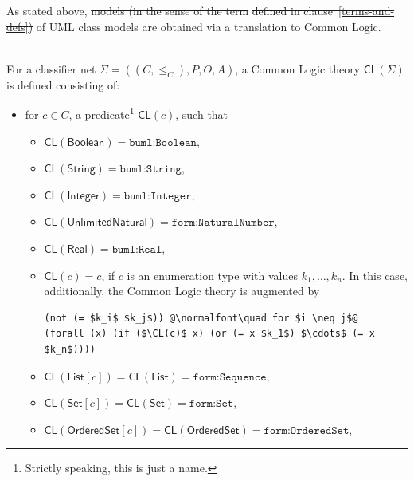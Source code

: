 \documentclass[10pt, a4paper]{isov2}
\newcommand{\ec}[0]{~\\{{\color{violet}\large \hrulefill {\normalfont{end}} \hrulefill\\}  }}
\newcommand*{\termref}[1]{\index{#1}#1\xspace}
\newcommand*{\CL}{\ensuremath{\mathsf{CL}}\xspace}
\providecommand{\DIFaddtex}[1]{{\protect\color{blue}\uwave{#1}}} %
\providecommand{\DIFdeltex}[1]{{\protect\color{red}\sout{#1}}}                      %
\providecommand{\DIFaddbegin}{} %
\providecommand{\DIFaddend}{} %
\providecommand{\DIFdelbegin}{} %
\providecommand{\DIFdelend}{} %
\providecommand{\DIFadd}[1]{\texorpdfstring{\DIFaddtex{#1}}{#1}} %
\providecommand{\DIFdel}[1]{\texorpdfstring{\DIFdeltex{#1}}{}} %
\begin{document}
As stated above, \DIFdelbegin \DIFdel{models (in the sense of the term }%
\DIFdel{defined in
clause~\ref{terms-and-defs}) }\DIFdelend \DIFaddbegin \DIFadd{realizations }\DIFaddend of UML class models are obtained 
via a translation to Common Logic.
\ec

For a classifier net $\Sigma = ((C, {\leq_C}), P, O, A)$,
a Common Logic theory $\CL(\Sigma)$ is defined consisting of:
%
 \begin{itemize} [topsep=0pt, label=--, leftmargin=*]
  \item for $c \in C$,
a predicate\footnote{Strictly speaking, this is just a name.} $\CL(c)$,
such that
 \begin{itemize} [topsep=0pt, label=--, leftmargin=*]
  \item $\CL(\mathsf{Boolean}) = \texttt{buml:Boolean}$,

  \item $\CL(\mathsf{String}) = \texttt{buml:String}$,

  \item $\CL(\mathsf{Integer}) = \texttt{buml:Integer}$,

  \item $\CL(\mathsf{UnlimitedNatural}) = \texttt{form:NaturalNumber}$,

  \item $\CL(\mathsf{Real}) = \texttt{buml:Real}$,

  \item $\CL(c) = c$,
if $c$
is an enumeration type with values $k_1, \ldots, k_n$.
In this case, additionally, the Common Logic theory is augmented by
%
\begin{lstlisting}[language=clif, mathescape, escapechar=@]
(not (= $k_i$ $k_j$)) @\normalfont\quad for $i \neq j$@
(forall (x) (if ($\CL(c)$ x) (or (= x $k_1$) $\cdots$ (= x $k_n$))))
\end{lstlisting}

  \item $\CL(\mathsf{List}[c]) = \CL(\mathsf{List}) = \texttt{form:Sequence}$,

  \item $\CL(\mathsf{Set}[c]) = \CL(\mathsf{Set}) = \texttt{form:Set}$,

  \item $\CL(\mathsf{OrderedSet}[c]) = \CL(\mathsf{OrderedSet}) = \texttt{form:OrderedSet}$,


\end{itemize}
\end{itemize}
\end{document}
